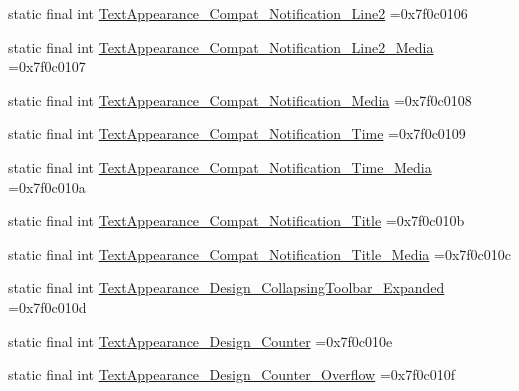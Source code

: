 \begin{DoxyCompactItemize}
\item 
static final int \mbox{\hyperlink{classbr_1_1unb_1_1cic_1_1mp_1_1marketmaster_1_1test_1_1R_1_1style_a0b8bbd3121dfa7310f5ffc37f7c80201}{Text\+Appearance\+\_\+\+Compat\+\_\+\+Notification\+\_\+\+Line2}} =0x7f0c0106
\item 
static final int \mbox{\hyperlink{classbr_1_1unb_1_1cic_1_1mp_1_1marketmaster_1_1test_1_1R_1_1style_a95093de9e7442204c05a184224893de5}{Text\+Appearance\+\_\+\+Compat\+\_\+\+Notification\+\_\+\+Line2\+\_\+\+Media}} =0x7f0c0107
\item 
static final int \mbox{\hyperlink{classbr_1_1unb_1_1cic_1_1mp_1_1marketmaster_1_1test_1_1R_1_1style_afd7d59a734e2af80728d6b1f6b994647}{Text\+Appearance\+\_\+\+Compat\+\_\+\+Notification\+\_\+\+Media}} =0x7f0c0108
\item 
static final int \mbox{\hyperlink{classbr_1_1unb_1_1cic_1_1mp_1_1marketmaster_1_1test_1_1R_1_1style_a599b2111f42c95a63ec30f0bc4b96dc7}{Text\+Appearance\+\_\+\+Compat\+\_\+\+Notification\+\_\+\+Time}} =0x7f0c0109
\item 
static final int \mbox{\hyperlink{classbr_1_1unb_1_1cic_1_1mp_1_1marketmaster_1_1test_1_1R_1_1style_a0a6f94ff394fb158451da1f2759ced2a}{Text\+Appearance\+\_\+\+Compat\+\_\+\+Notification\+\_\+\+Time\+\_\+\+Media}} =0x7f0c010a
\item 
static final int \mbox{\hyperlink{classbr_1_1unb_1_1cic_1_1mp_1_1marketmaster_1_1test_1_1R_1_1style_aef01a026e55da0d95eb1e6561fc0dab0}{Text\+Appearance\+\_\+\+Compat\+\_\+\+Notification\+\_\+\+Title}} =0x7f0c010b
\item 
static final int \mbox{\hyperlink{classbr_1_1unb_1_1cic_1_1mp_1_1marketmaster_1_1test_1_1R_1_1style_afb234fa97fd1d97f86afb09f562b594a}{Text\+Appearance\+\_\+\+Compat\+\_\+\+Notification\+\_\+\+Title\+\_\+\+Media}} =0x7f0c010c
\item 
static final int \mbox{\hyperlink{classbr_1_1unb_1_1cic_1_1mp_1_1marketmaster_1_1test_1_1R_1_1style_a354d7d4827adcce76d81b28e3b2e65f9}{Text\+Appearance\+\_\+\+Design\+\_\+\+Collapsing\+Toolbar\+\_\+\+Expanded}} =0x7f0c010d
\item 
static final int \mbox{\hyperlink{classbr_1_1unb_1_1cic_1_1mp_1_1marketmaster_1_1test_1_1R_1_1style_a07c66ca92120651f46b9f13608a0bbac}{Text\+Appearance\+\_\+\+Design\+\_\+\+Counter}} =0x7f0c010e
\item 
static final int \mbox{\hyperlink{classbr_1_1unb_1_1cic_1_1mp_1_1marketmaster_1_1test_1_1R_1_1style_a288ced19293e0ffd4009fa6048e3e08f}{Text\+Appearance\+\_\+\+Design\+\_\+\+Counter\+\_\+\+Overflow}} =0x7f0c010f

\end{DoxyCompactItemize}
